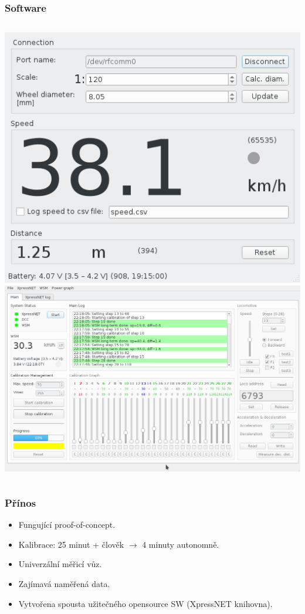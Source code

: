 \documentclass[aspectratio=169]{beamer}
\begin{document}
\begin{frame}
\frametitle{Software}
\begin{columns}[t]
	\includegraphics[align=c,width=\columnwidth]{data/speed_reader_screenshot.png}
	\pause
	\includegraphics[align=c,width=\columnwidth]{data/ac_progress.png}
\end{columns}
\end{frame}


\begin{frame}
\frametitle{Přínos}
\begin{itemize}
\item Fungující proof-of-concept.
\item Kalibrace: 25 minut + člověk $\rightarrow$ 4 minuty autonomně.
\item Univerzální měřicí vůz.
\item Zajímavá naměřená data.
\item Vytvořena spousta užitečného opensource SW (XpressNET knihovna).
\end{itemize}
\end{frame}

\end{document}
